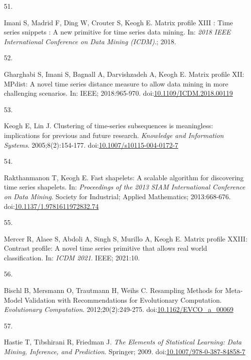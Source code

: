 \documentclass[12pt,twoside]{fmupthesis}
\newlength{\csllabelwidth}
\newlength{\cslhangindent}
\newenvironment{CSLReferences}[2] %
 {%
  \setlength{\parindent}{0pt}
  \ifodd #1 \everypar{\setlength{\hangindent}{\cslhangindent}}\ignorespaces\fi
  \ifnum #2 > 0
  \setlength{\parskip}{#2\baselineskip}
  \fi
 }%
 {}
\newcommand{\CSLLeftMargin}[1]{\parbox[t]{\csllabelwidth}{#1}}
\newcommand{\CSLRightInline}[1]{\parbox[t]{\linewidth - \csllabelwidth}{#1}}
\begin{document}
\begin{CSLReferences}{0}{0}
\leavevmode{}%
\CSLLeftMargin{51. }
\CSLRightInline{Imani S, Madrid F, Ding W, Crouter S, Keogh E. Matrix profile XIII : Time series snippets : A new primitive for time series data mining. In: \emph{2018 IEEE International Conference on Data Mining (ICDM)}.; 2018.}

\leavevmode{}%
\CSLLeftMargin{52. }
\CSLRightInline{Gharghabi S, Imani S, Bagnall A, Darvishzadeh A, Keogh E. Matrix profile XII: MPdist: A novel time series distance measure to allow data mining in more challenging scenarios. In: IEEE; 2018:965-970. doi:\href{https://doi.org/10.1109/ICDM.2018.00119}{10.1109/ICDM.2018.00119}}

\leavevmode{}%
\CSLLeftMargin{53. }
\CSLRightInline{Keogh E, Lin J. {Clustering of time-series subsequences is meaningless: implications for previous and future research}. \emph{Knowledge and Information Systems}. 2005;8(2):154-177. doi:\href{https://doi.org/10.1007/s10115-004-0172-7}{10.1007/s10115-004-0172-7}}

\leavevmode{}%
\CSLLeftMargin{54. }
\CSLRightInline{Rakthanmanon T, Keogh E. Fast shapelets: A scalable algorithm for discovering time series shapelets. In: \emph{Proceedings of the 2013 SIAM International Conference on Data Mining}. Society for Industrial; Applied Mathematics; 2013:668-676. doi:\href{https://doi.org/10.1137/1.9781611972832.74}{10.1137/1.9781611972832.74}}

\leavevmode{}%
\CSLLeftMargin{55. }
\CSLRightInline{Mercer R, Alaee S, Abdoli A, Singh S, Murillo A, Keogh E. Matrix profile XXIII: Contrast profile: A novel time series primitive that allows real world classification. In: \emph{ICDM 2021}. IEEE; 2021:10.}

\leavevmode{}%
\CSLLeftMargin{56. }
\CSLRightInline{Bischl B, Mersmann O, Trautmann H, Weihs C. {Resampling Methods for Meta-Model Validation with Recommendations for Evolutionary Computation}. \emph{Evolutionary Computation}. 2012;20(2):249-275. doi:\href{https://doi.org/10.1162/EVCO_a_00069}{10.1162/EVCO\_a\_00069}}

\leavevmode{}%
\CSLLeftMargin{57. }
\CSLRightInline{Hastie T, Tibshirani R, Friedman J. \emph{{The Elements of Statistical Learning: Data Mining, Inference, and Prediction}}. Springer; 2009. doi:\href{https://doi.org/10.1007/978-0-387-84858-7}{10.1007/978-0-387-84858-7}}


\end{CSLReferences}
\end{document}
